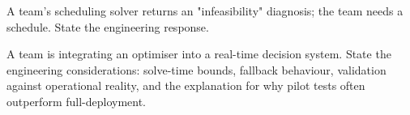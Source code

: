 \begin{exercise}
A team's scheduling solver returns an "infeasibility" diagnosis; the team needs a schedule. State the engineering response.
\end{exercise}

\begin{exercise}
A team is integrating an optimiser into a real-time decision system. State the engineering considerations: solve-time bounds, fallback behaviour, validation against operational reality, and the explanation for why pilot tests often outperform full-deployment.
\end{exercise}
